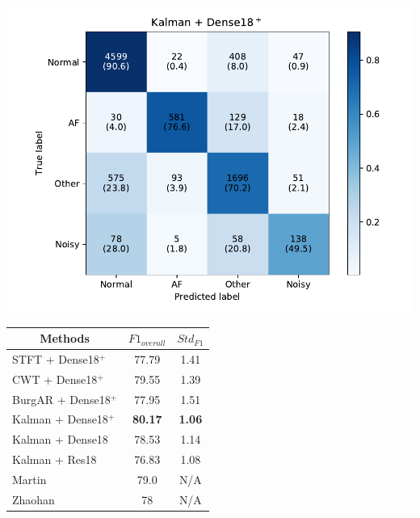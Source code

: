 \documentclass[portrait,a0,final]{a0poster} %
\begin{document}
\begin{minipage}{0.98\linewidth}
\begin{minipage}[t]{0.47\linewidth}
\begin{minipage}[t]{\linewidth}
\begin{minipage}[t]{0.48\linewidth}
	\centering
	\includegraphics[width=0.95\linewidth,trim=1.17cm 0.4cm 3.35cm 0cm,clip]{figures/cm_kalman}
\end{minipage}
\begin{minipage}[t]{0.48\linewidth}
	\vspace{-14cm}
\large
\begin{tabular}{|l|c|c|}
	\hline
	 \multicolumn{1}{|c|}{Methods}           & $F1_{overall}$  & $Std_{F1}$ \\ \hline
	 STFT + Dense18$^+$                          & 77.79          & 1.41       \\ \hline
	 CWT + Dense18$^+$                           & 79.55          & 1.39      \\ \hline
	 BurgAR + Dense18$^+$                         & 77.95          & 1.51       \\ \hline
	 Kalman + Dense18$^+$                        & \textbf{80.17} & \textbf{1.06}       \\ \hline
	 Kalman + Dense18                       & 78.53          & 1.14      \\ \hline
	 Kalman + Res18                         & 76.83          & 1.08       \\ \hline
	 Martin & 79.0            & N/A         \\ \hline
	 Zhaohan                                & 78              & N/A         \\ \hline
\end{tabular}
\end{minipage}
\end{minipage}


\end{minipage}
\end{minipage}
\end{document}
